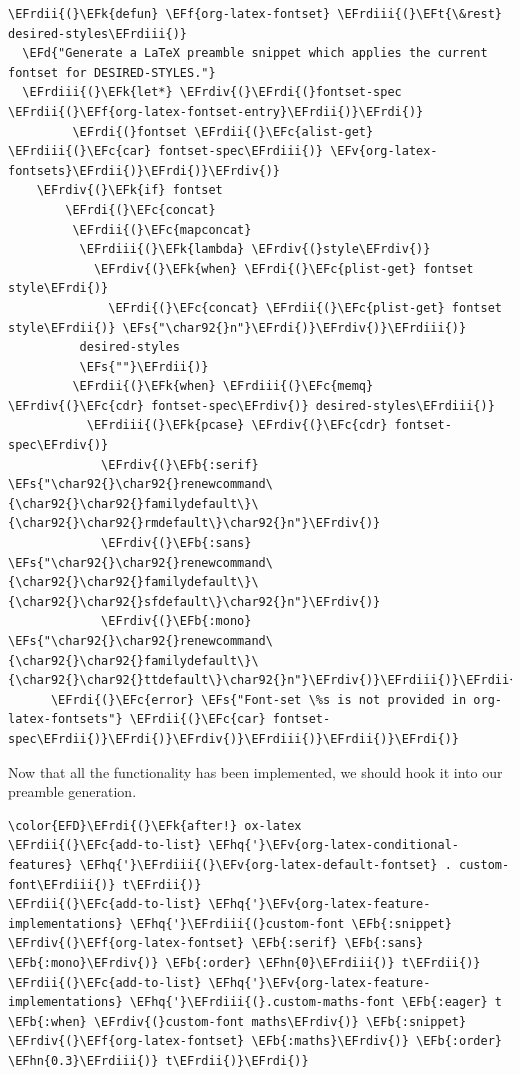 \documentclass{scrartcl}
\newcommand{\EFk}[1]{\textcolor{EFk}{#1}} %
\newcommand{\EFd}[1]{\textcolor{EFd}{#1}} %
\newcommand{\EFt}[1]{\textcolor{EFt}{#1}} %
\newcommand{\EFs}[1]{\textcolor{EFs}{#1}} %
\newcommand{\EFb}[1]{\textcolor{EFb}{#1}} %
\newcommand{\EFc}[1]{\textcolor{EFc}{#1}} %
\newcommand{\EFv}[1]{\textcolor{EFv}{#1}} %
\newcommand{\EFf}[1]{\textcolor{EFf}{#1}} %
\newcommand{\EFhn}[1]{#1} %
\newcommand{\EFhq}[1]{#1} %
\newcommand{\EFrdi}[1]{#1} %
\newcommand{\EFrdii}[1]{#1} %
\newcommand{\EFrdiii}[1]{#1} %
\newcommand{\EFrdiv}[1]{#1} %
\begin{document}
\begin{Code}
\begin{Verbatim}[]
\EFrdii{(}\EFk{defun} \EFf{org-latex-fontset} \EFrdiii{(}\EFt{\&rest} desired-styles\EFrdiii{)}
  \EFd{"Generate a LaTeX preamble snippet which applies the current fontset for DESIRED-STYLES."}
  \EFrdiii{(}\EFk{let*} \EFrdiv{(}\EFrdi{(}fontset-spec \EFrdii{(}\EFf{org-latex-fontset-entry}\EFrdii{)}\EFrdi{)}
         \EFrdi{(}fontset \EFrdii{(}\EFc{alist-get} \EFrdiii{(}\EFc{car} fontset-spec\EFrdiii{)} \EFv{org-latex-fontsets}\EFrdii{)}\EFrdi{)}\EFrdiv{)}
    \EFrdiv{(}\EFk{if} fontset
        \EFrdi{(}\EFc{concat}
         \EFrdii{(}\EFc{mapconcat}
          \EFrdiii{(}\EFk{lambda} \EFrdiv{(}style\EFrdiv{)}
            \EFrdiv{(}\EFk{when} \EFrdi{(}\EFc{plist-get} fontset style\EFrdi{)}
              \EFrdi{(}\EFc{concat} \EFrdii{(}\EFc{plist-get} fontset style\EFrdii{)} \EFs{"\char92{}n"}\EFrdi{)}\EFrdiv{)}\EFrdiii{)}
          desired-styles
          \EFs{""}\EFrdii{)}
         \EFrdii{(}\EFk{when} \EFrdiii{(}\EFc{memq} \EFrdiv{(}\EFc{cdr} fontset-spec\EFrdiv{)} desired-styles\EFrdiii{)}
           \EFrdiii{(}\EFk{pcase} \EFrdiv{(}\EFc{cdr} fontset-spec\EFrdiv{)}
             \EFrdiv{(}\EFb{:serif} \EFs{"\char92{}\char92{}renewcommand\{\char92{}\char92{}familydefault\}\{\char92{}\char92{}rmdefault\}\char92{}n"}\EFrdiv{)}
             \EFrdiv{(}\EFb{:sans} \EFs{"\char92{}\char92{}renewcommand\{\char92{}\char92{}familydefault\}\{\char92{}\char92{}sfdefault\}\char92{}n"}\EFrdiv{)}
             \EFrdiv{(}\EFb{:mono} \EFs{"\char92{}\char92{}renewcommand\{\char92{}\char92{}familydefault\}\{\char92{}\char92{}ttdefault\}\char92{}n"}\EFrdiv{)}\EFrdiii{)}\EFrdii{)}\EFrdi{)}
      \EFrdi{(}\EFc{error} \EFs{"Font-set \%s is not provided in org-latex-fontsets"} \EFrdii{(}\EFc{car} fontset-spec\EFrdii{)}\EFrdi{)}\EFrdiv{)}\EFrdiii{)}\EFrdii{)}\EFrdi{)}
\end{Verbatim}
\end{Code}

Now that all the functionality has been implemented, we should hook it into our
preamble generation.

\begin{Code}
\begin{Verbatim}[]
\color{EFD}\EFrdi{(}\EFk{after!} ox-latex
\EFrdii{(}\EFc{add-to-list} \EFhq{'}\EFv{org-latex-conditional-features} \EFhq{'}\EFrdiii{(}\EFv{org-latex-default-fontset} . custom-font\EFrdiii{)} t\EFrdii{)}
\EFrdii{(}\EFc{add-to-list} \EFhq{'}\EFv{org-latex-feature-implementations} \EFhq{'}\EFrdiii{(}custom-font \EFb{:snippet} \EFrdiv{(}\EFf{org-latex-fontset} \EFb{:serif} \EFb{:sans} \EFb{:mono}\EFrdiv{)} \EFb{:order} \EFhn{0}\EFrdiii{)} t\EFrdii{)}
\EFrdii{(}\EFc{add-to-list} \EFhq{'}\EFv{org-latex-feature-implementations} \EFhq{'}\EFrdiii{(}.custom-maths-font \EFb{:eager} t \EFb{:when} \EFrdiv{(}custom-font maths\EFrdiv{)} \EFb{:snippet} \EFrdiv{(}\EFf{org-latex-fontset} \EFb{:maths}\EFrdiv{)} \EFb{:order} \EFhn{0.3}\EFrdiii{)} t\EFrdii{)}\EFrdi{)}
\end{Verbatim}
\end{Code}
\end{document}
